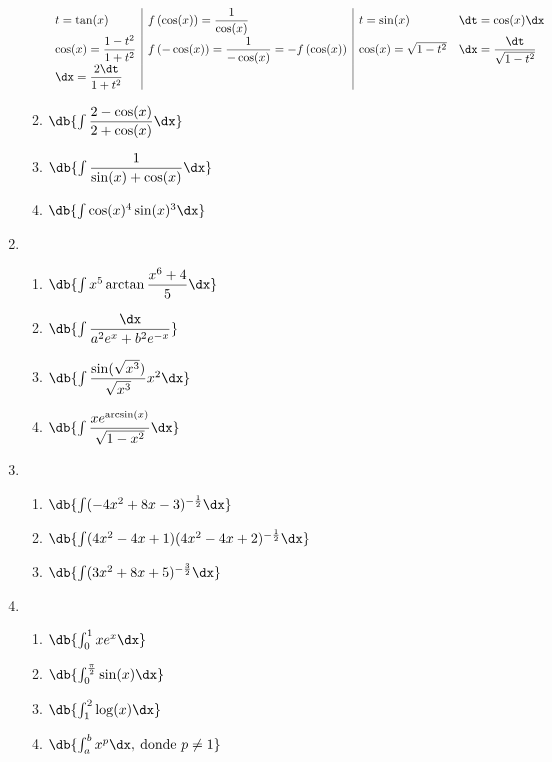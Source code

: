 \begin{enumerate}[label=\color{red}\textbf{\arabic*)}, leftmargin=*]
\begin{enumerate}[label=\color{red}\alph*)]
            $\begin{array}{l|l|ll}
                  t=\tan(x) & f\left(\cos(x)\right)=\dfrac{1}{\cos(x)} & t=\sin(x) & \dt=\cos(x)\dx\\
                  \cos(x)=\dfrac{1-t^2}{1+t^2} & f\left(-\cos(x)\right)=\dfrac{1}{-\cos(x)}=-f\left(\cos(x)\right) & \cos(x)=\sqrt{1-t^2} & \dx=\dfrac{\dt}{\sqrt{1-t^2}}\\
                  \dx=\dfrac{2\dt}{1+t^2} & & &
            \end{array}$
		\item $\db{\int\dfrac{2-\cos(x)}{2+\cos(x)}\dx}$
		\item $\db{\int\dfrac{1}{\sin(x)+\cos(x)}\dx}$
		\item $\db{\int\cos(x)^4\sin(x)^3\dx}$
	\end{enumerate}
	\item {}
	\begin{enumerate}[label=\color{red}\alph*)]
		\item $\db{\int x^5\arctan\dfrac{x^6+4}{5}\dx}$
		\item $\db{\int\dfrac{\dx}{a^2e^x+b^2e^{-x}}}$
		\item $\db{\int\dfrac{\sin(\sqrt{x^3})}{\sqrt{x^3}}x^2\dx}$
		\item $\db{\int\dfrac{xe^{\arcsin(x)}}{\sqrt{1-x^2}}\dx}$
	\end{enumerate}
	\item {}
	\begin{enumerate}[label=\color{red}\alph*)]
		\item $\db{\int(-4x^2+8x-3)^{-\frac{1}{2}}\dx}$
		\item $\db{\int(4x^2-4x+1)(4x^2-4x+2)^{-\frac{1}{2}}\dx}$
		\item $\db{\int(3x^2+8x+5)^{-\frac{3}{2}}\dx}$
	\end{enumerate}
	\item {}
	\begin{enumerate}[label=\color{red}\alph*)]
		\item $\db{\int_{0}^{1}xe^x\dx}$
		\item $\db{\int_{0}^{\frac{\pi}{2}}\sin(x)\dx}$
		\item $\db{\int_{1}^{2}\log(x)\dx}$
		\item $\db{\int_{a}^{b}x^p\dx,\:\text{donde }p\neq1}$

\end{enumerate}
\end{enumerate}

